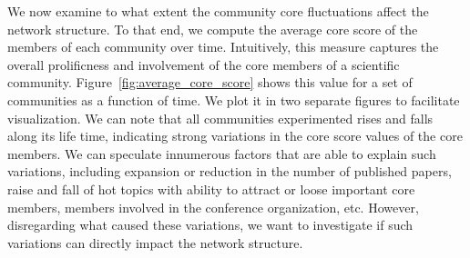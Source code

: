 We now examine to what extent the community core fluctuations affect the network structure.  To that end, we compute the average core score of the members of each community over
time. Intuitively, this measure captures the overall prolificness and involvement of the core members of a scientific community. Figure~\ref{fig:average_core_score} shows this value
for a set of communities as a function of time. We plot it in two separate figures to facilitate visualization. We can note that all communities experimented rises and falls along
its life time, indicating strong variations in the core score values of the core members. We can speculate innumerous factors that are able to explain such variations,
including expansion or reduction in the number of published papers, raise and fall of hot topics with ability to attract or loose important core members, members involved in the
conference organization, etc. However, disregarding what caused these variations, we want to investigate if such variations can directly impact the network structure.


